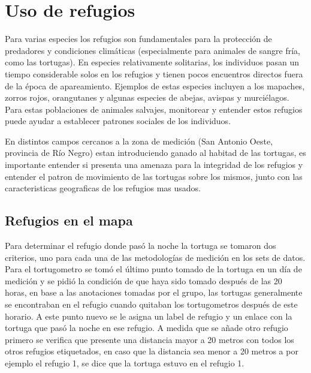 \chapter{Uso de refugios}
Para varias especies los refugios son fundamentales para la protección de predadores y  condiciones climáticas (especialmente para animales de sangre fría, como las tortugas). En especies relativamente solitarias, los individuos pasan un tiempo considerable solos en los refugios y tienen pocos encuentros directos fuera de la época de apareamiento.
Ejemplos de estas especies incluyen a los mapaches, zorros rojos, orangutanes y algunas especies de abejas, avispas y murciélagos. Para estas poblaciones de animales salvajes, monitorear y entender estos refugios puede ayudar a establecer patrones sociales de los individuos.
 
En distintos campos cercanos a la zona de medición (San Antonio Oeste, provincia de Río Negro) estan introduciendo ganado al habitad de las tortugas, es importante entender si presenta una amenaza para la integridad de los refugios y entender el patron de movimiento  de las tortugas sobre los mismos, junto con las caracteristicas geograficas de los refugios mas usados.
 
\section{Refugios en el mapa}
Para determinar el refugio donde pasó la noche la tortuga se tomaron dos criterios, uno para cada una de las metodologías de medición en los sets de datos. Para el tortugometro se tomó el último punto tomado de la tortuga en un día de medición y se pidió la condición de que haya sido tomado después de las 20 horas, en base a las anotaciones tomadas por el grupo, las tortugas generalmente  se encontraban en el refugio cuando quitaban los tortugometros después de este horario. A este punto nuevo se le asigna un label de refugio y un enlace con la tortuga que pasó la noche en ese refugio. A medida que se añade otro refugio primero se verifica que presente una distancia mayor a 20 metros con todos los otros refugios etiquetados, en caso que la distancia sea menor a 20 metros a por ejemplo el refugio 1, se dice que la tortuga estuvo en el refugio 1.
 
